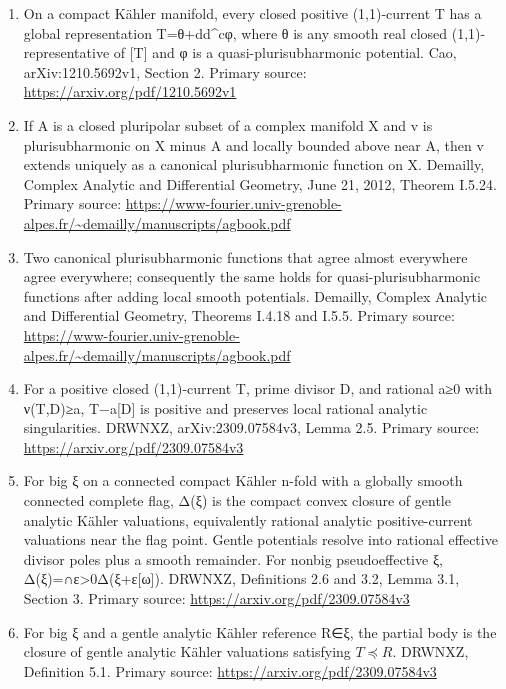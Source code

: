 \documentclass[11pt]{article}
\begin{document}
\begin{enumerate}
\item[1.] On a compact Kähler manifold, every closed positive (1,1)-\allowbreak{}current T has a global representation T=\allowbreak{}θ+dd\textasciicircum{}\allowbreak{}cφ, where θ is any smooth real closed (1,1)-\allowbreak{}representative of [T] and φ is a quasi-\allowbreak{}plurisubharmonic potential. Cao, arXiv:1210.5692v1, Section 2. Primary source: \url{https://arxiv.org/pdf/1210.5692v1}

\item[2.] If A is a closed pluripolar subset of a complex manifold X and v is plurisubharmonic on X minus A and locally bounded above near A, then v extends uniquely as a canonical plurisubharmonic function on X. Demailly, Complex Analytic and Differential Geometry, June 21, 2012, Theorem I.5.24. Primary source: \url{https://www-fourier.univ-grenoble-alpes.fr/~demailly/manuscripts/agbook.pdf}

\item[3.] Two canonical plurisubharmonic functions that agree almost everywhere agree everywhere; consequently the same holds for quasi-\allowbreak{}plurisubharmonic functions after adding local smooth potentials. Demailly, Complex Analytic and Differential Geometry, Theorems I.4.18 and I.5.5. Primary source: \url{https://www-fourier.univ-grenoble-alpes.fr/~demailly/manuscripts/agbook.pdf}

\item[4.] For a positive closed (1,1)-\allowbreak{}current T, prime divisor D, and rational a≥0 with ν(T,D)≥a, T−a[D] is positive and preserves local rational analytic singularities. DRWNXZ, arXiv:2309.07584v3, Lemma 2.5. Primary source: \url{https://arxiv.org/pdf/2309.07584v3}

\item[5.] For big ξ on a connected compact Kähler n-\allowbreak{}fold with a globally smooth connected complete flag, Δ(ξ) is the compact convex closure of gentle analytic Kähler valuations, equivalently rational analytic positive-\allowbreak{}current valuations near the flag point. Gentle potentials resolve into rational effective divisor poles plus a smooth remainder. For nonbig pseudoeffective ξ, Δ(ξ)=\allowbreak{}∩ε>0Δ(ξ+ε[ω]). DRWNXZ, Definitions 2.6 and 3.2, Lemma 3.1, Section 3. Primary source: \url{https://arxiv.org/pdf/2309.07584v3}

\item[6.] For big ξ and a gentle analytic Kähler reference R∈ξ, the partial body is the closure of gentle analytic Kähler valuations satisfying $T\preceq R$. DRWNXZ, Definition 5.1. Primary source: \url{https://arxiv.org/pdf/2309.07584v3}


\end{enumerate}
\end{document}
